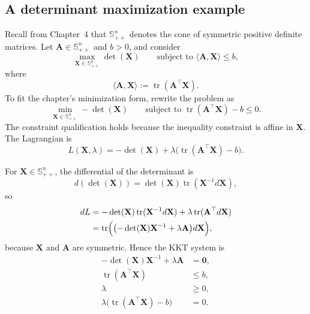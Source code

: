 \subsection{A determinant maximization example}
\begin{example}
\label{ex:ch7-det-max}
Recall from Chapter~4 that $\mathbb{S}_{++}^n$ denotes the cone of symmetric
positive definite matrices. Let $\mathbf{A}\in \mathbb{S}_{++}^n$ and $b>0$,
and consider
\[
  \max_{\mathbf{X}\in \mathbb{S}_{++}^n}
  \det(\mathbf{X})
  \qquad
  \text{subject to }
  \langle \mathbf{A},\mathbf{X}\rangle \le b,
\]
where
\[
  \langle \mathbf{A},\mathbf{X}\rangle
  := \operatorname{tr}(\mathbf{A}^\top \mathbf{X}).
\]
To fit the chapter's minimization form, rewrite the problem as
\[
  \min_{\mathbf{X}\in \mathbb{S}_{++}^n} -\det(\mathbf{X})
  \qquad
  \text{subject to }
  \operatorname{tr}(\mathbf{A}^\top \mathbf{X})-b \le 0.
\]
The constraint qualification holds because the inequality constraint is affine
in $\mathbf{X}$.
The Lagrangian is
\[
  L(\mathbf{X},\lambda)
  =
  -\det(\mathbf{X})
  +\lambda\bigl(\operatorname{tr}(\mathbf{A}^\top \mathbf{X})-b\bigr).
\]

For $\mathbf{X}\in \mathbb{S}_{++}^n$, the differential of the determinant is
\[
  d(\det(\mathbf{X}))
  =
  \det(\mathbf{X}) \operatorname{tr}(\mathbf{X}^{-1} d\mathbf{X}),
\]
so
\begin{align*}
  dL
  &=
  -\det(\mathbf{X}) \operatorname{tr}(\mathbf{X}^{-1} d\mathbf{X})
  + \lambda \operatorname{tr}(\mathbf{A}^\top d\mathbf{X}) \\
  &=
  \operatorname{tr}\Bigl(
    \bigl(-\det(\mathbf{X})\mathbf{X}^{-1} + \lambda \mathbf{A}\bigr)
    d\mathbf{X}
  \Bigr),
\end{align*}
because $\mathbf{X}$ and $\mathbf{A}$ are symmetric. Hence the KKT system is
\begin{equation}
  \label{eq:ch7-det-kkt}
  \begin{aligned}
    -\det(\mathbf{X})\mathbf{X}^{-1} + \lambda \mathbf{A} &= \mathbf{0}, \\
    \operatorname{tr}(\mathbf{A}^\top \mathbf{X}) &\le b, \\
    \lambda &\ge 0, \\
    \lambda\bigl(\operatorname{tr}(\mathbf{A}^\top \mathbf{X})-b\bigr) &= 0.
  \end{aligned}
\end{equation}


\end{example}
